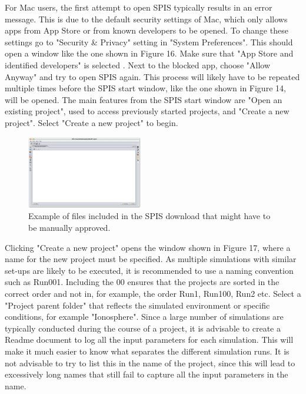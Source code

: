 \documentclass[a4paper, 11pt]{article}
\begin{document}
For Mac users, the first attempt to open SPIS typically results in an error message. This is due to the default security settings of Mac, which only allows apps from App Store or from known developers to be opened. To change these settings go to "Security \& Privacy" setting in "System Preferences". This should open a window like the one shown in Figure 16. Make sure that "App Store and identified developers" is selected . Next to the blocked app, choose "Allow Anyway" and try to open SPIS again. This process will likely have to be repeated multiple times before the SPIS start window, like the one shown in Figure 14, will be opened. The main features from the SPIS start window are "Open an existing project", used to access previously started projects, and "Create a new project". Select "Create a new project" to begin.

\begin{figure}[!ht]
    \centering
    \includegraphics[width=0.45\textwidth]{fig16.jpg}
    \caption{Example of files included in the SPIS download that might have to be manually approved.}
\end{figure}

Clicking "Create a new project" opens the window shown in Figure 17, where a name for the new project must be specified. As multiple simulations with similar set-ups are likely to be executed, it is recommended to use a naming convention such as Run001. Including the 00 ensures that the projects are sorted in the correct order and not in, for example, the order Run1, Run100, Run2 etc. Select a "Project parent folder" that reflects the simulated environment or specific conditions, for example "Ionosphere". Since a large number of simulations are typically conducted during the course of a project, it is advisable to create a Readme document to log all the input parameters for each simulation. This will make it much easier to know what separates the different simulation runs. It is not advisable to try to list this in the name of the project, since this will lead to excessively long names that still fail to capture all the input parameters in the name.
\end{document}

